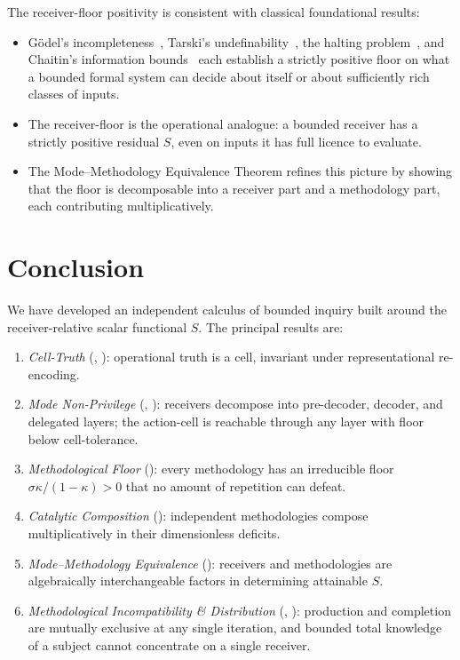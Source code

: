 \documentclass[twocolumn,11pt,a4paper]{article}
\begin{document}
The receiver-floor positivity is consistent with classical foundational
results:
\begin{itemize}[leftmargin=*]
\item G\"odel's incompleteness~\cite{godel1931}, Tarski's
undefinability~\cite{tarski1933}, the
halting problem~\cite{turing1936}, and Chaitin's
information bounds~\cite{chaitin1974} each establish a strictly positive
floor on what a bounded formal system can decide about itself or about
sufficiently rich classes of inputs.
\item The receiver-floor is the operational analogue: a bounded receiver
has a strictly positive residual $S$, even on inputs it has full
licence to evaluate.
\item The Mode--Methodology Equivalence Theorem refines this picture by
showing that the floor is decomposable into a receiver part and a
methodology part, each contributing multiplicatively.
\end{itemize}

\section{Conclusion}
\label{sec:conclusion}

We have developed an independent calculus of bounded inquiry built around
the receiver-relative scalar functional $S$. The principal results are:

\begin{enumerate}[label=(\arabic*),leftmargin=*]
\item \emph{Cell-Truth} (, ):
operational truth is a cell, invariant under representational re-encoding.
\item \emph{Mode Non-Privilege} (,
): receivers decompose into pre-decoder, decoder,
and delegated layers; the action-cell is reachable through any layer with
floor below cell-tolerance.
\item \emph{Methodological Floor} (): every
methodology has an irreducible floor $\sigma\kappa/(1-\kappa)>0$ that no
amount of repetition can defeat.
\item \emph{Catalytic Composition} (): independent
methodologies compose multiplicatively in their dimensionless deficits.
\item \emph{Mode--Methodology Equivalence}
(): receivers and methodologies are
algebraically interchangeable factors in determining attainable $S$.
\item \emph{Methodological Incompatibility \& Distribution}
(, ): production and
completion are mutually exclusive at any single iteration, and bounded
total knowledge of a subject cannot concentrate on a single receiver.
\end{enumerate}
\end{document}
